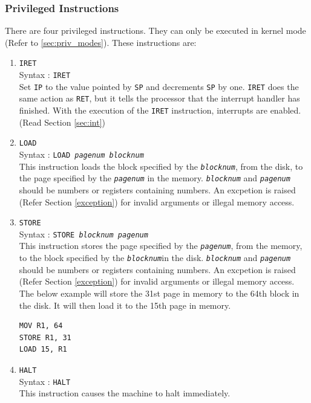 \documentclass[11pt]{report}
\begin{document}
\subsubsection{Privileged Instructions}
There are four privileged instructions. They can only be executed in kernel mode (Refer to \ref{sec:priv_modes}).  These instructions are:
\begin{enumerate}

\item \texttt{IRET}\\
Syntax : \texttt{IRET}\\

Set \texttt{IP} to the value pointed by \texttt{SP} and decrements \texttt{SP} by one. \texttt{IRET} does the same action as \texttt{RET}, but it tells the processor that the interrupt handler has finished. With the execution of the \texttt{IRET} instruction, interrupts are enabled. (Read Section \ref{sec:int})

\item \texttt{LOAD}\\
Syntax : \texttt{LOAD \textit{pagenum} \textit{blocknum}}\\
This instruction loads the block specified by the \texttt{\textit{blocknum}}, from the disk, to the page specified by the \texttt{\textit{pagenum}} in the memory. \texttt{\textit{blocknum}} and \texttt{\textit{pagenum}} should be numbers or registers containing numbers. An excpetion is raised (Refer Section \ref{exception}) for invalid arguments or illegal memory access.

\item \texttt{STORE}\\
Syntax : \texttt{STORE \textit{blocknum} \textit{pagenum} }\\ 
This instruction stores the page specified by the \texttt{\textit{pagenum}}, from the memory, to the block specified by the \texttt{\textit{blocknum}}in the disk. \texttt{\textit{blocknum}} and \texttt{\textit{pagenum}} should be numbers or registers containing numbers. An excpetion is raised (Refer Section \ref{exception}) for invalid arguments or illegal memory access.\\

The below example will store the 31st page in memory to the 64th block in the disk. It will then load it to the 15th page in memory.
\begin{verbatim}
MOV R1, 64
STORE R1, 31
LOAD 15, R1	
\end{verbatim}	

\item \texttt{HALT}\\
Syntax : \texttt{HALT}\\
This instruction causes the machine to halt immediately. 
\end{enumerate}
\end{document}
